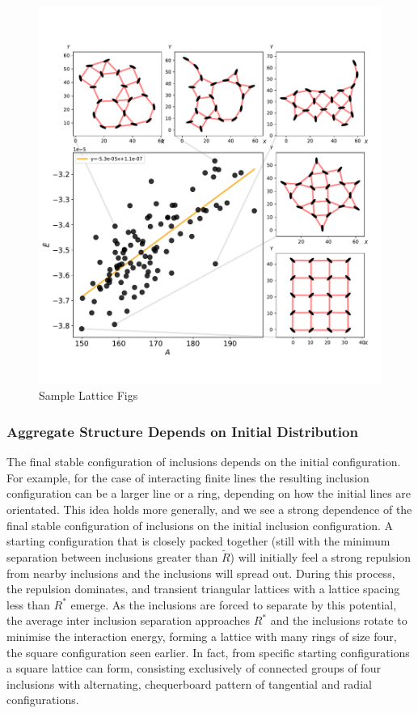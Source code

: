 
\begin{figure}[h]
\centering
\includegraphics[width=12cm]{elastic_figs/autoLatticeEgs100slope.pdf}
\caption{Sample Lattice Figs}
\end{figure}

\subsubsection{Aggregate Structure Depends on Initial Distribution}

The final stable configuration of inclusions depends on the initial configuration. For example, for the case of interacting finite lines the resulting inclusion configuration can be a larger line or a ring, depending on how the initial lines are orientated. This idea holds more generally, and we see a strong dependence of the final stable configuration of inclusions on the initial inclusion configuration. A starting configuration that is closely packed together (still with the minimum separation between inclusions greater than $\tilde{R}$) will initially feel a strong repulsion from nearby inclusions and the inclusions will spread out. During this process, the repulsion dominates, and transient triangular lattices with a lattice spacing less than $R^*$ emerge. As the inclusions are forced to separate by this potential, the average inter inclusion separation approaches $R^*$ and the inclusions rotate to minimise the interaction energy, forming a lattice with many rings of size four, the square configuration seen earlier. In fact, from specific starting configurations a square lattice can form, consisting exclusively of connected groups of four inclusions with alternating, chequerboard pattern of tangential and radial configurations.

